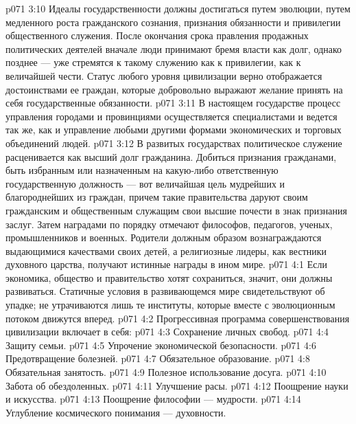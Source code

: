 \vs p071 3:10 Идеалы государственности должны достигаться путем эволюции, путем медленного роста гражданского сознания, признания обязанности и привилегии общественного служения. После окончания срока правления продажных политических деятелей вначале люди принимают бремя власти как долг, однако позднее --- уже стремятся к такому служению как к привилегии, как к величайшей чести. Статус любого уровня цивилизации верно отображается достоинствами ее граждан, которые добровольно выражают желание принять на себя государственные обязанности.
\vs p071 3:11 В настоящем государстве процесс управления городами и провинциями осуществляется специалистами и ведется так же, как и управление любыми другими формами экономических и торговых объединений людей.
\vs p071 3:12 В развитых государствах политическое служение расценивается как высший долг гражданина. Добиться признания гражданами, быть избранным или назначенным на какую\hyp{}либо ответственную государственную должность --- вот величайшая цель мудрейших и благороднейших из граждан, причем такие правительства даруют своим гражданским и общественным служащим свои высшие почести в знак признания заслуг. Затем наградами по порядку отмечают философов, педагогов, ученых, промышленников и военных. Родители должным образом вознаграждаются выдающимися качествами своих детей, а религиозные лидеры, как вестники духовного царства, получают истинные награды в ином мире.
\vs p071 4:1 Если экономика, общество и правительство хотят сохраниться, значит, они должны развиваться. Статичные условия в развивающемся мире свидетельствуют об упадке; не утрачиваются лишь те институты, которые вместе с эволюционным потоком движутся вперед.
\vs p071 4:2 \pc Прогрессивная программа совершенствования цивилизации включает в себя:
\vs p071 4:3 \bibnobreakspace Сохранение личных свобод.
\vs p071 4:4 \bibnobreakspace Защиту семьи.
\vs p071 4:5 \bibnobreakspace Упрочение экономической безопасности.
\vs p071 4:6 \bibnobreakspace Предотвращение болезней.
\vs p071 4:7 \bibnobreakspace Обязательное образование.
\vs p071 4:8 \bibnobreakspace Обязательная занятость.
\vs p071 4:9 \bibnobreakspace Полезное использование досуга.
\vs p071 4:10 \bibnobreakspace Забота об обездоленных.
\vs p071 4:11 \bibnobreakspace Улучшение расы.
\vs p071 4:12 \bibnobreakspace Поощрение науки и искусства.
\vs p071 4:13 \bibnobreakspace Поощрение философии --- мудрости.
\vs p071 4:14 \bibnobreakspace Углубление космического понимания --- духовности.
